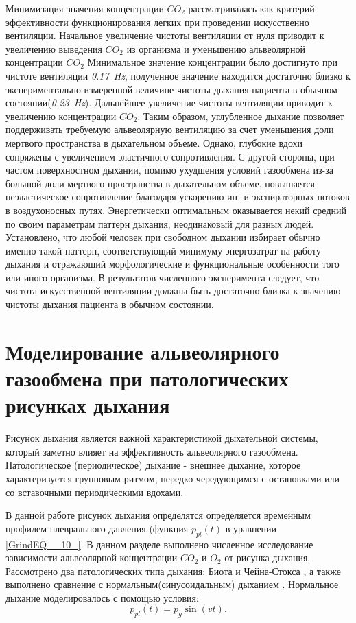 Минимизация значения концентрации $CO_{2} $ рассматривалась как критерий эффективности функционирования легких при проведении искусственно вентиляции. Начальное увеличение чистоты вентиляции от нуля приводит к увеличению выведения $CO_{2} $ из организма и уменьшению альвеолярной концентрации $CO_{2} $  Минимальное значение концентрации было достигнуто при чистоте вентиляции \textit{0.17~Hz}, полученное значение находится достаточно близко к экспериментально измеренной величине чистоты дыхания пациента в обычном состоянии(\textit{0.23~Hz}). Дальнейшее увеличение чистоты вентиляции приводит к увеличению концентрации  $CO_{2} $. Таким образом, углубленное дыхание позволяет поддерживать требуемую альвеолярную вентиляцию за счет уменьшения доли мертвого пространства в дыхательном объеме. Однако, глубокие вдохи сопряжены с увеличением эластичного сопротивления. С другой стороны, при частом поверхностном дыхании, помимо ухудшения условий газообмена из-за большой доли мертвого пространства в дыхательном объеме, повышается неэластическое сопротивление благодаря ускорению ин- и экспираторных потоков в воздухоносных путях. Энергетически оптимальным оказывается некий средний по своим параметрам паттерн дыхания, неодинаковый для разных людей. Установлено, что любой человек при свободном дыхании избирает обычно именно такой паттерн, соответствующий минимуму энергозатрат на работу дыхания и отражающий морфологические и функциональные особенности того или иного организма. В результатов численного эксперимента следует, что чистота искусственной вентиляции должны быть достаточно близка к значению чистоты дыхания пациента в обычном состоянии.  

\section{Моделирование альвеолярного газообмена при патологических рисунках дыхания}
Рисунок дыхания является важной характеристикой дыхательной системы, который заметно влияет на эффективность альвеолярного газообмена. Патологическое (периодическое) дыхание -  внешнее дыхание, которое характеризуется групповым ритмом, нередко чередующимся с остановками или со вставочными периодическими вдохами. 

В данной работе рисунок дыхания определятся определяется временным профилем плеврального давления (функция $p_{pl} \left(t\right)$ в уравнении \eqref{GrindEQ__10_}. В данном разделе выполнено численное исследование зависимости альвеолярной концентрации $CO_{2} $ и $O_{2} $ от рисунка дыхания. Рассмотрено два патологических типа дыхания: Биота и Чейна-Стокса \cite{Wijdicks2007,Pearce2002}, а также выполнено сравнение с нормальным(синусоидальным) дыханием \cite{schmidt}. Нормальное дыхание моделировалось с помощью условия:
\begin{equation} \label{GrindEQ__40_} 
p_{pl} \left(t\right)=p_{g} \sin \left(vt\right).  
\end{equation}

